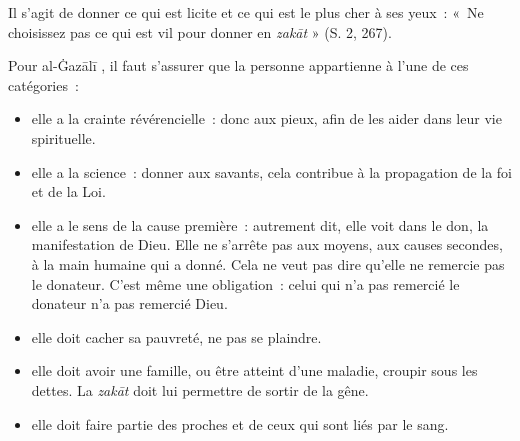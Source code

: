 Il s'agit de donner ce qui est licite et ce qui est le plus cher à ses
yeux~: «~Ne choisissez pas ce qui est vil pour donner en \emph{zakāt} »
(S. 2, 267).


Pour al-Ġazālī \label{theol:AlGazali15}, il faut s'assurer que la personne appartienne à l'une de
ces catégories~:

\begin{itemize}
\item
  elle a la crainte révérencielle~: donc aux pieux, afin de les aider
  dans leur vie spirituelle.
\item
  elle a la science~: donner aux savants, cela contribue à la
  propagation de la foi et de la Loi.
\item
  elle a le sens de la cause première~: autrement dit, elle voit dans le
  don, la manifestation de Dieu. Elle ne s'arrête pas aux moyens, aux
  causes secondes, à la main humaine qui a donné. Cela ne veut pas dire
  qu'elle ne remercie pas le donateur. C'est même une obligation~: celui
  qui n'a pas remercié le donateur n'a pas remercié Dieu.
\item
  elle doit cacher sa pauvreté, ne pas se plaindre.
\item
  elle doit avoir une famille, ou être atteint d'une maladie, croupir
  sous les dettes. La \emph{zakāt} doit lui permettre de sortir de la
  gêne.
\item
  elle doit faire partie des proches et de ceux qui sont liés par le
  sang.
\end{itemize}



 


